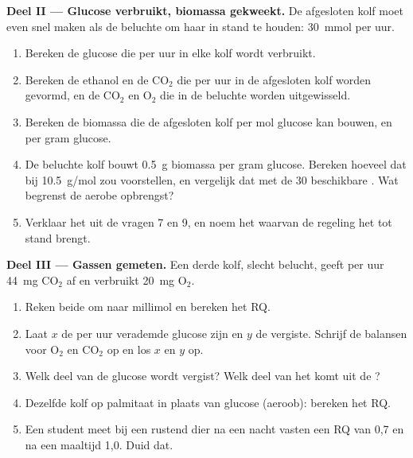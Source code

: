 \begin{problem}
\medskip
\noindent\textbf{Deel II --- Glucose verbruikt, biomassa gekweekt.}
De afgesloten kolf moet even snel  maken als de beluchte om haar  in stand
te houden: \qty{30}{mmol}  per uur.
\begin{enumerate}[resume]
  \item Bereken de glucose die per uur in elke kolf wordt verbruikt.
  \item Bereken de ethanol en de $\mathrm{CO_2}$ die per uur in de
        afgesloten kolf worden gevormd, en de $\mathrm{CO_2}$ en
        $\mathrm{O_2}$ die in de beluchte worden uitgewisseld.
  \item Bereken de biomassa die de afgesloten kolf per mol glucose kan
        bouwen, en per gram glucose.
  \item De beluchte kolf bouwt \qty{0.5}{g} biomassa per gram glucose.
        Bereken hoeveel  dat bij \qty{10.5}{g/mol} zou voorstellen, en
        vergelijk dat met de 30 beschikbare . Wat begrenst de aerobe
        opbrengst?
  \item Verklaar het  uit de vragen 7 en 9, en noem het 
        waarvan de regeling het tot stand brengt.
\end{enumerate}

\medskip
\noindent\textbf{Deel III --- Gassen gemeten.}
Een derde kolf, slecht belucht, geeft per uur \qty{44}{mg} $\mathrm{CO_2}$ af en
verbruikt \qty{20}{mg} $\mathrm{O_2}$.
\begin{enumerate}[resume]
  \item Reken beide om naar millimol en bereken het RQ.
  \item Laat $x$ de per uur verademde glucose zijn en $y$ de vergiste.
        Schrijf de balansen voor $\mathrm{O_2}$ en $\mathrm{CO_2}$ op en
        los $x$ en $y$ op.
  \item Welk deel van de glucose wordt vergist? Welk deel van het  komt
        uit de ?
  \item Dezelfde kolf op palmitaat in plaats van glucose (aeroob): bereken
        het RQ.
  \item Een student meet bij een rustend dier na een nacht vasten een RQ
        van 0,7 en na een maaltijd 1,0. Duid dat.
\end{enumerate}


\end{problem}
